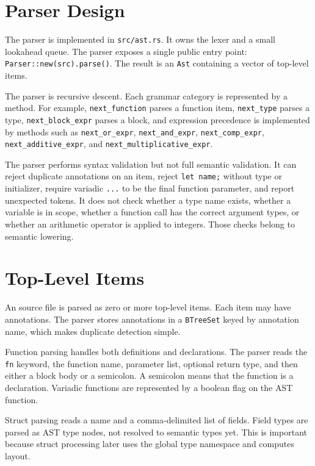 \section{Parser Design}

The parser is implemented in \texttt{src/ast.rs}. It owns the lexer and a small
lookahead queue. The parser exposes a single public entry point:
\texttt{Parser::new(src).parse()}. The result is an \texttt{Ast} containing a
vector of top-level items.

The parser is recursive descent. Each grammar category is represented by a
method. For example, \texttt{next\_function} parses a function item,
\texttt{next\_type} parses a type, \texttt{next\_block\_expr} parses a block,
and expression precedence is implemented by methods such as
\texttt{next\_or\_expr}, \texttt{next\_and\_expr},
\texttt{next\_comp\_expr}, \texttt{next\_additive\_expr}, and
\texttt{next\_multiplicative\_expr}.

The parser performs syntax validation but not full semantic validation. It can
reject duplicate annotations on an item, reject \texttt{let name;} without type
or initializer, require variadic \texttt{...} to be the final function
parameter, and report unexpected tokens. It does not check whether a type name
exists, whether a variable is in scope, whether a function call has the correct
argument types, or whether an arithmetic operator is applied to integers. Those
checks belong to semantic lowering.

\section{Top-Level Items}

An \epl{} source file is parsed as zero or more top-level items. Each item may
have annotations. The parser stores annotations in a \texttt{BTreeSet} keyed by
annotation name, which makes duplicate detection simple.

Function parsing handles both definitions and declarations. The parser reads the
\texttt{fn} keyword, the function name, parameter list, optional return type,
and then either a block body or a semicolon. A semicolon means that the function
is a declaration. Variadic functions are represented by a boolean flag on the
AST function.

Struct parsing reads a name and a comma-delimited list of fields. Field types
are parsed as AST type nodes, not resolved to semantic types yet. This is
important because struct processing later uses the global type namespace and
computes layout.


